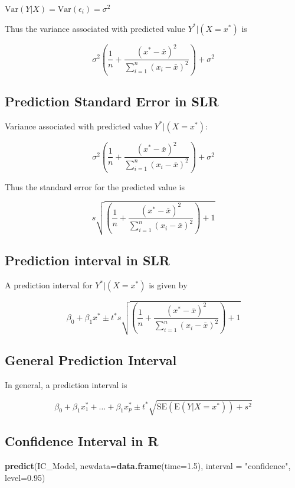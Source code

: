 \documentclass[]{book}
\newenvironment{Shaded}{\begin{snugshade}}{\end{snugshade}}
\newcommand{\KeywordTok}[1]{\textcolor[rgb]{0.13,0.29,0.53}{\textbf{#1}}}
\newcommand{\DataTypeTok}[1]{\textcolor[rgb]{0.13,0.29,0.53}{#1}}
\newcommand{\FloatTok}[1]{\textcolor[rgb]{0.00,0.00,0.81}{#1}}
\newcommand{\StringTok}[1]{\textcolor[rgb]{0.31,0.60,0.02}{#1}}
\newcommand{\NormalTok}[1]{#1}
\begin{document}
\(\text{Var}(Y|X)=\text{Var}(\epsilon_i)=\sigma^2\)

Thus the variance associated with predicted value \(Y^*|(X=x^*)\) is

\[
\sigma^2\left(\frac{1}{n}+ \frac{(x^*-\bar{x})^2}{\displaystyle\sum_{i=1}^n(x_i-\bar{x})^2}\right) + \sigma^2
\]

\subsection{Prediction Standard Error in
SLR}\label{prediction-standard-error-in-slr}

Variance associated with predicted value \(Y^*|(X=x^*)\):

\[
\sigma^2\left(\frac{1}{n}+ \frac{(x^*-\bar{x})^2}{\displaystyle\sum_{i=1}^n(x_i-\bar{x})^2}\right) + \sigma^2
\]

Thus the standard error for the predicted value is

\[
s\sqrt{\left(\frac{1}{n}+ \frac{(x^*-\bar{x})^2}{\displaystyle\sum_{i=1}^n(x_i-\bar{x})^2}\right) + 1}
\]

\subsection{Prediction interval in
SLR}\label{prediction-interval-in-slr}

A prediction interval for \(Y^*|(X=x^*)\) is given by

\[\beta_0 + \beta_1x^* \pm t^* s\sqrt{\left(\frac{1}{n}+ \frac{(x^*-\bar{x})^2}{\displaystyle\sum_{i=1}^n(x_i-\bar{x})^2}\right) + 1}
\]

\subsection{General Prediction
Interval}\label{general-prediction-interval}

In general, a prediction interval is

\[
\beta_0 + \beta_1x_1^* + \ldots + \beta_1x_p^* \pm t^* \sqrt{\text{SE}(\text{E}(Y|X=x^*)) + s^2}
\]

\subsection{Confidence Interval in R}\label{confidence-interval-in-r-1}

\begin{Shaded}
\begin{Highlighting}[]
\KeywordTok{predict}\NormalTok{(IC_Model, }\DataTypeTok{newdata=}\KeywordTok{data.frame}\NormalTok{(}\DataTypeTok{time=}\FloatTok{1.5}\NormalTok{), }\DataTypeTok{interval =} \StringTok{"confidence"}\NormalTok{, }\DataTypeTok{level=}\FloatTok{0.95}\NormalTok{)}
\end{Highlighting}
\end{Shaded}
\end{document}
